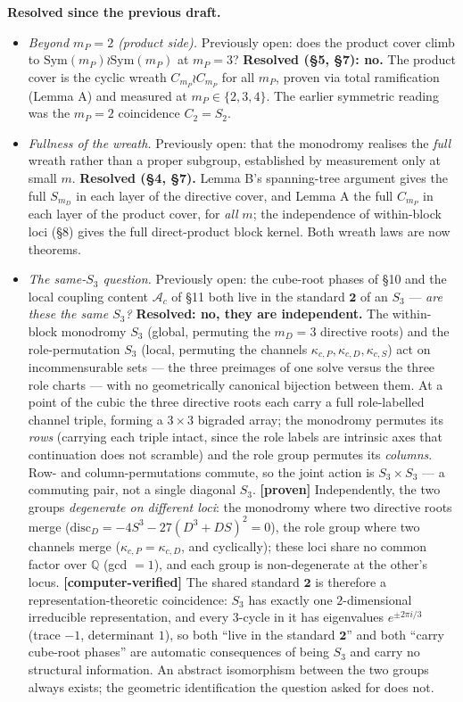 \documentclass[11pt]{article}
\theoremstyle{plain}
\theoremstyle{definition}
\theoremstyle{remark}
\begin{document}
\textbf{Resolved since the previous draft.}

\begin{itemize}
\item
  \emph{Beyond \(m_P=2\) (product side).} Previously open: does the product cover climb to \(\mathrm{Sym}(m_P)\wr\mathrm{Sym}(m_P)\) at \(m_P=3\)? \textbf{Resolved (§5, §7): no.} The product cover is the cyclic wreath \(C_{m_P}\wr C_{m_P}\) for all \(m_P\), proven via total ramification (Lemma A) and measured at \(m_P\in\{2,3,4\}\). The earlier symmetric reading was the \(m_P=2\) coincidence \(C_2 = S_2\).
\item
  \emph{Fullness of the wreath.} Previously open: that the monodromy realises the \emph{full} wreath rather than a proper subgroup, established by measurement only at small \(m\). \textbf{Resolved (§4, §7).} Lemma B's spanning-tree argument gives the full \(S_{m_D}\) in each layer of the directive cover, and Lemma A the full \(C_{m_P}\) in each layer of the product cover, for \emph{all} \(m\); the independence of within-block loci (§8) gives the full direct-product block kernel. Both wreath laws are now theorems.
\item
  \emph{The same-\(S_3\) question.} Previously open: the cube-root phases of §10 and the local coupling content \(\mathcal A_c\) of §11 both live in the standard \(\mathbf 2\) of an \(S_3\) --- \emph{are these the same \(S_3\)?} \textbf{Resolved: no, they are independent.} The within-block monodromy \(S_3\) (global, permuting the \(m_D=3\) directive roots) and the role-permutation \(S_3\) (local, permuting the channels \(\kappa_{c,P},\kappa_{c,D},\kappa_{c,S}\)) act on incommensurable sets --- the three preimages of one solve versus the three role charts --- with no geometrically canonical bijection between them. At a point of the cubic the three directive roots each carry a full role-labelled channel triple, forming a \(3\times3\) bigraded array; the monodromy permutes its \emph{rows} (carrying each triple intact, since the role labels are intrinsic axes that continuation does not scramble) and the role group permutes its \emph{columns}. Row- and column-permutations commute, so the joint action is \(S_3\times S_3\) --- a commuting pair, not a single diagonal \(S_3\). \textbf{{[}proven{]}} Independently, the two groups \emph{degenerate on different loci}: the monodromy where two directive roots merge (\(\mathrm{disc}_D = -4S^3 - 27(D^3+DS)^2 = 0\)), the role group where two channels merge (\(\kappa_{c,P}=\kappa_{c,D}\), and cyclically); these loci share no common factor over \(\mathbb Q\) (gcd \(=1\)), and each group is non-degenerate at the other's locus. \textbf{{[}computer-verified{]}} The shared standard \(\mathbf 2\) is therefore a representation-theoretic coincidence: \(S_3\) has exactly one \(2\)-dimensional irreducible representation, and every \(3\)-cycle in it has eigenvalues \(e^{\pm 2\pi i/3}\) (trace \(-1\), determinant \(1\)), so both ``live in the standard \(\mathbf 2\)'' and both ``carry cube-root phases'' are automatic consequences of being \(S_3\) and carry no structural information. An abstract isomorphism between the two groups always exists; the geometric identification the question asked for does not.

\end{itemize}
\end{document}

